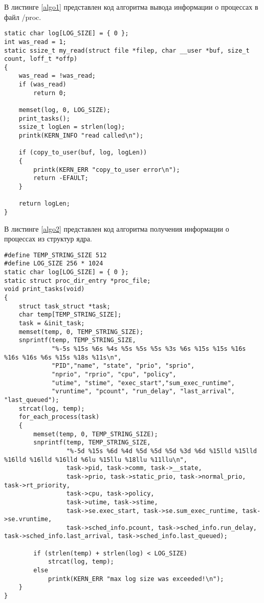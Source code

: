 В листинге \ref{algo1} представлен код алгоритма вывода информации о процессах в файл /proc.
\begin{lstlisting}[label=algo1,caption=Реализация алгоритма вывода информации о процессах]
static char log[LOG_SIZE] = { 0 };
int was_read = 1;
static ssize_t my_read(struct file *filep, char __user *buf, size_t count, loff_t *offp)
{
    was_read = !was_read;
    if (was_read)
        return 0;
        
    memset(log, 0, LOG_SIZE);
    print_tasks();
    ssize_t logLen = strlen(log);
    printk(KERN_INFO "read called\n");

    if (copy_to_user(buf, log, logLen))
    {
        printk(KERN_ERR "copy_to_user error\n");
        return -EFAULT;
    }

    return logLen;
}
\end{lstlisting}
В листинге \ref{algo2} представлен код алгоритма получения информации о процессах из структур ядра.
\begin{lstlisting}[label=algo2,caption=Реализация алгоритма получения информации о процессах из структур ядра]
#define TEMP_STRING_SIZE 512
#define LOG_SIZE 256 * 1024
static char log[LOG_SIZE] = { 0 };
static struct proc_dir_entry *proc_file;
void print_tasks(void)
{
    struct task_struct *task;
    char temp[TEMP_STRING_SIZE];
    task = &init_task;
    memset(temp, 0, TEMP_STRING_SIZE);
    snprintf(temp, TEMP_STRING_SIZE,
             "%-5s %15s %6s %4s %5s %5s %5s %3s %6s %15s %15s %16s %16s %16s %6s %15s %18s %11s\n",
             "PID","name", "state", "prio", "sprio",
             "nprio", "rprio", "cpu", "policy",
             "utime", "stime", "exec_start","sum_exec_runtime",
             "vruntime", "pcount", "run_delay", "last_arrival", "last_queued");
    strcat(log, temp);
    for_each_process(task)
    {
        memset(temp, 0, TEMP_STRING_SIZE);
        snprintf(temp, TEMP_STRING_SIZE,
                 "%-5d %15s %6d %4d %5d %5d %5d %3d %6d %15lld %15lld %16lld %16lld %16lld %6lu %15llu %18llu %11llu\n",
                 task->pid, task->comm, task->__state,
                 task->prio, task->static_prio, task->normal_prio, task->rt_priority,
                 task->cpu, task->policy,
                 task->utime, task->stime,
                 task->se.exec_start, task->se.sum_exec_runtime, task->se.vruntime,
                 task->sched_info.pcount, task->sched_info.run_delay, task->sched_info.last_arrival, task->sched_info.last_queued);

        if (strlen(temp) + strlen(log) < LOG_SIZE)
            strcat(log, temp);
        else
            printk(KERN_ERR "max log size was exceeded!\n");
    }
}
\end{lstlisting}

